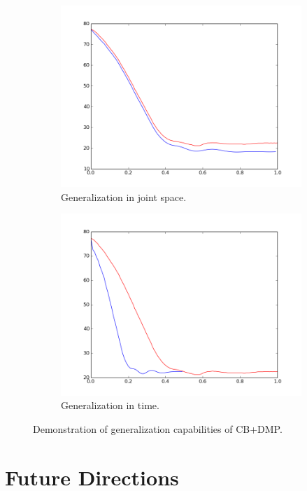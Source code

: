 \documentclass[a4paper]{article}
\begin{document}
 
\begin{figure}
\centering
\begin{subfigure}{.5\textwidth}
  \centering
  \includegraphics[width=.8\linewidth]{cb_dmp3.png}
  \caption{Generalization in joint space.}
  \label{fig:cbdmp3}
\end{subfigure}%
\begin{subfigure}{.5\textwidth}
  \centering
  \includegraphics[width=.8\linewidth]{cb_dmp4.png}
  \caption{Generalization in time.}
  \label{fig:cbdmp4}
\end{subfigure}
\caption{Demonstration of generalization capabilities of CB+DMP.}
\label{fig:ubot_gen}
\end{figure}

\section{Future Directions}
\end{document}
